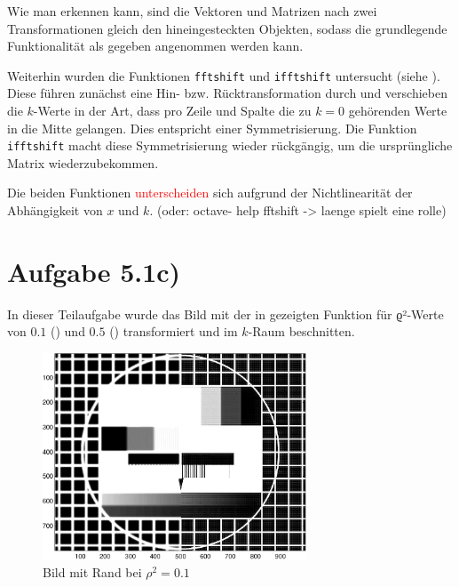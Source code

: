 Wie man erkennen kann, sind die Vektoren und Matrizen nach zwei Transformationen
gleich den hineingesteckten Objekten, sodass die grundlegende Funktionalität als
gegeben angenommen werden kann.

Weiterhin wurden die Funktionen \texttt{fftshift} und \texttt{ifftshift}
untersucht (siehe ). Diese führen zunächst eine Hin- bzw. Rücktransformation
durch und verschieben die $k$-Werte in der Art, dass pro Zeile und Spalte die 
zu $k=0$ gehörenden Werte in die Mitte gelangen. Dies entspricht einer Symmetrisierung.
Die Funktion \texttt{ifftshift} macht diese Symmetrisierung wieder rückgängig, um
die ursprüngliche Matrix wiederzubekommen.

Die beiden Funktionen \textcolor{red}{unterscheiden} sich aufgrund der Nichtlinearität der Abhängigkeit
von $x$ und $k$. (oder: octave- help fftshift -> laenge spielt eine rolle)


\section*{Aufgabe 5.1c)}
In dieser Teilaufgabe wurde das Bild mit der in  gezeigten Funktion für
ϱ²-Werte von $0.1$ () und $0.5$ ()
transformiert und im $k$-Raum beschnitten.

\begin{figure}[htb]
\centering
  \includegraphics[width=0.7\textwidth,keepaspectratio]{../tmp/eins_c_0_1-crop.pdf}
  \caption{Bild mit Rand bei $ρ^2 = 0.1$}
  \label{fig:pic_trafo_0_1}
\end{figure}

